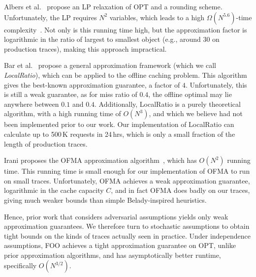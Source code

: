 \documentclass{article}
\begin{document}
Albers et al.~\cite{albers1999page} propose an LP relaxation of OPT and a rounding scheme.
Unfortunately, the LP requires $N^2$ variables, which leads to a high $\Omega(N^{5.6})$-time complexity~\cite{koufogiannakis2014nearly}.
Not only is this running time high, but the approximation factor is logarithmic in the ratio of largest to smallest object (e.g., around 30 on production traces), making this approach impractical.

Bar et al.~\cite{bar2001unified} propose a general approximation framework (which we call \emph{LocalRatio}), which can be applied to the offline caching problem.
This algorithm gives the best-known approximation guarantee, a factor of $4$.
Unfortunately, this is still a weak guarantee, as for miss ratio of $0.4$, the offline optimal may lie anywhere between $0.1$ and $0.4$.
Additionally, LocalRatio is a purely theoretical algorithm, with a high running time of $O(N^3)$, and which we believe had not been implemented prior to our work.
Our implementation of LocalRatio can calculate up to 500\,K requests in 24\,hrs, which is only a small fraction of the length of production traces.

Irani proposes the OFMA approximation algorithm~\cite{irani1997page}, which has $O(N^2)$ running time.
This running time is small enough for our implementation of OFMA to run on small traces.
Unfortunately, OFMA achieves a weak approximation guarantee, logarithmic in the cache capacity $C$,
and in fact OFMA does badly on our traces, giving much weaker bounds than simple Belady-inspired heuristics.

Hence, prior work that considers adversarial assumptions yields only weak approximation guarantees.
We therefore turn to stochastic assumptions to obtain tight bounds on the kinds of traces actually seen in practice.
Under independence assumptions, FOO achieves a tight approximation guarantee on OPT, unlike prior approximation algorithms,
and has asymptotically better runtime, specifically $O\!\left(N^{3/2}\!\right)$.



\end{document}
